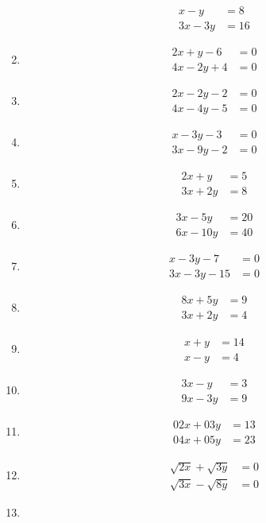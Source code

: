 \begin{multicols}{2}
\begin{enumerate}[label=\thesubsection.\arabic*,ref=\thesubsection.\theenumi]
\begin{align*}
	x-y&=8\\
	3x-3y&=16
	\end{align*}
\item \begin{align*}
 	2x+y-6&=0\\
 	4x-2y+4&=0
	\end{align*}
\item \begin{align*}
	2x-2y-2&=0\\
	4x-4y-5&=0
	\end{align*}
	\item \begin{align*}
	x-3y-3&=0\\
	3x-9y-2&=0
        \end{align*}
       \item \begin{align*}
	2x+y&=5\\
	3x+2y&=8
	\end{align*}
	\item \begin{align*}
	3x-5y&=20\\
	6x-10y&=40
	\end{align*}
	\item \begin{align*}
	x-3y-7&=0\\
	3x-3y-15&=0
        \end{align*}
\item \begin{align*}
8x+5y&=9
\\ 3x+2y&=4
\end{align*}
	\item
	\begin{align*}
   	 x+y&=14 \\x-y&=4
	\end{align*}
	\item
	\begin{align*}
    	3x-y&=3\\ 9x-3y&=9
	\end{align*}
\item 	\begin{align*}   	
 	02x+03y&=13\\ 04x+05y&=23
	\end{align*}
	\item     
	\begin{align*}
	\sqrt{2x}+\sqrt{3y}&=0\\ \sqrt{3x}-\sqrt{8y}&=0
	\end{align*}
	\item

\end{enumerate}
\end{multicols}
